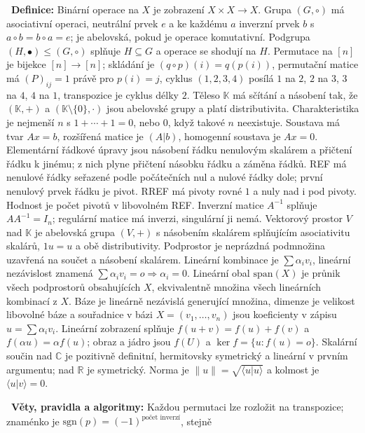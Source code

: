 \begin{odpoved}
\setlength{\parskip}{2pt}
\noindent{}\ \textbf{Definice:} Binární operace na $X$ je zobrazení $X\times X\to X$.
Grupa $(G,\circ)$ má asociativní operaci, neutrální prvek $e$ a ke každému $a$ inverzní
prvek $b$ s $a\circ b=b\circ a=e$; je abelovská, pokud je operace komutativní. Podgrupa
$(H,\bullet)\le(G,\circ)$ splňuje $H\subseteq G$ a operace se shodují na $H$. Permutace
na $[n]$ je bijekce $[n]\to[n]$; skládání je $(q\circ p)(i)=q(p(i))$, permutační matice
má $(P)_{ij}=1$ právě pro $p(i)=j$, cyklus $(1,2,3,4)$ posílá $1$ na $2$, $2$ na $3$,
$3$ na $4$, $4$ na $1$, transpozice je cyklus délky $2$. Těleso $\mathbb K$ má sčítání
a násobení tak, že $(\mathbb K,+)$ a $(\mathbb K\setminus\{0\},\cdot)$ jsou abelovské
grupy a platí distributivita. Charakteristika je nejmenší $n$ s $1+\cdots+1=0$, nebo
$0$, když takové $n$ neexistuje. Soustava má tvar $Ax=b$, rozšířená matice je $(A|b)$,
homogenní soustava je $Ax=0$. Elementární řádkové úpravy jsou násobení řádku nenulovým
skalárem a přičtení řádku k jinému; z nich plyne přičtení násobku řádku a záměna řádků.
REF má nenulové řádky seřazené podle počátečních nul a nulové řádky dole; první nenulový
prvek řádku je pivot. RREF má pivoty rovné $1$ a nuly nad i pod pivoty. Hodnost je počet
pivotů v libovolném REF. Inverzní matice $A^{-1}$ splňuje $AA^{-1}=I_n$; regulární matice
má inverzi, singulární ji nemá. Vektorový prostor $V$ nad $\mathbb K$ je abelovská grupa
$(V,+)$ s násobením skalárem splňujícím asociativitu skalárů, $1u=u$ a obě distributivity.
Podprostor je neprázdná podmnožina uzavřená na součet a násobení skalárem. Lineární
kombinace je $\sum\alpha_i v_i$, lineární nezávislost znamená
$\sum\alpha_i v_i=o\Rightarrow\alpha_i=0$. Lineární obal $\mathrm{span}(X)$ je průnik
všech podprostorů obsahujících $X$, ekvivalentně množina všech lineárních kombinací z $X$.
Báze je lineárně nezávislá generující množina, dimenze je velikost libovolné báze a
souřadnice v bázi $X=(v_1,\ldots,v_n)$ jsou koeficienty v zápisu $u=\sum\alpha_i v_i$.
Lineární zobrazení splňuje $f(u+v)=f(u)+f(v)$ a $f(\alpha u)=\alpha f(u)$; obraz a jádro
jsou $f(U)$ a $\ker f=\{u:f(u)=o\}$. Skalární součin nad $\mathbb C$ je pozitivně definitní,
hermitovsky symetrický a lineární v prvním argumentu; nad $\mathbb R$ je symetrický.
Norma je $\|u\|=\sqrt{\langle u|u\rangle}$ a kolmost je $\langle u|v\rangle=0$.\par
\noindent{}\ \textbf{Věty, pravidla a algoritmy:} Každou permutaci lze rozložit na
transpozice; znaménko je $\mathrm{sgn}(p)=(-1)^{\text{počet inverzí}}$, stejně

\end{odpoved}
